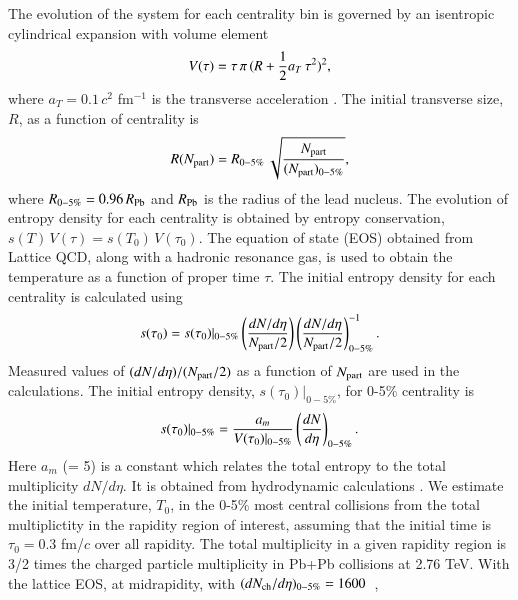 {  The evolution of the system for each centrality bin is governed by
  an isentropic cylindrical expansion with volume element
  \begin{equation}
    V(\tau) = \tau\,\pi\,(R + {1\over 2} a_{T} \, \tau^2 )^{2},
  \end{equation}
  where $a_{T} = 0.1\,c^2$ fm$^{-1}$ is the transverse acceleration \cite{Zhao:2011cv}.
  The initial transverse size, $R$, as a function of centrality is
  \begin{equation}
    R(N_{\rm part}) = R_{0-5\%} \, \sqrt{N_{\rm part} \over (N_{\rm part})_{0-5\%} },
    \label{RVsNPart}
  \end{equation}
  where $R_{0-5\%} = 0.96\,R_{\rm Pb}$ and $R_{\rm Pb}$ is the radius of the lead nucleus.
  The evolution of entropy density for each centrality is obtained by entropy conservation, 
  $s(T)\,V(\tau)= s(T_0)\,V(\tau_0)$.
  The equation of state (EOS) obtained from Lattice QCD, along with a hadronic resonance gas, \cite{Huovinen:2009yb} 
  is used to obtain the temperature as a function of proper time $\tau$.
  The initial entropy density for each centrality is calculated using 
  \begin{equation}
    s(\tau_0) = s(\tau_0)|_{0-5\%} \left(\frac{dN/d\eta}{N_{\rm part}/2}\right)\left(\frac{dN/d\eta}{N_{\rm part}/2}\right)^{-1}_{0-5\%}.
    \label{TempNpart}
  \end{equation}
  Measured values of $(dN/d\eta)/(N_{\rm part}/2)$ as a function of $N_{\rm part}$ 
  {\color{black} \cite{Aamodt:2010cz,Chatrchyan:2011pb}} are used in the calculations.
  The initial entropy density, $s(\tau_0)|_{0-5\%}$, for 0-5\% centrality is 
  \begin{eqnarray}
    s(\tau_0)|_{0-5\%}  = {a_{m} \over V(\tau_0)|_{0-5\%}}   \left(\frac{dN}{d\eta}\right)_{0-5\%} . 
    \label{TempVsMult}
  \end{eqnarray}  
  Here $a_m$ {\color{black}(= 5)} is a constant which relates the total entropy to the total 
  multiplicity $dN/d\eta$. It is obtained from hydrodynamic calculations \cite{Shuryak:1992wc}.
  {\color{black}
    We estimate the initial temperature, $T_0$, in the 0-5$\%$ most central collisions
    from the total multiplictity in the rapidity region of interest, assuming that the initial time is
    $\tau_0 = 0.3$ fm/$c$ over all rapidity.  The total multiplicity in a given rapidity region is
    3/2 times the charged particle multiplicity in Pb+Pb collisions at 2.76 TeV.  With the lattice
    EOS, at midrapidity, with $(dN_{\rm ch}/d\eta)_{0-5\%} = 1600$~\cite{Aamodt:2010cz,Chatrchyan:2011pb}, 
}}
